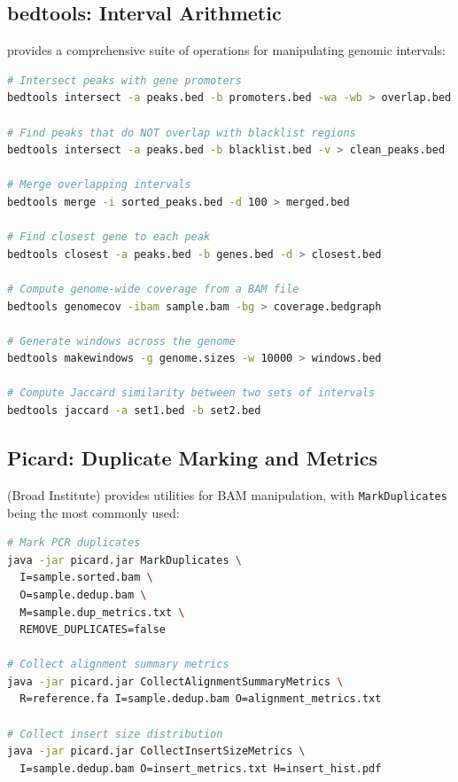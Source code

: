 \subsection{bedtools: Interval Arithmetic}
\label{subsec:bioinf:bedtools}

 provides a comprehensive suite of operations for manipulating genomic intervals:

\begin{lstlisting}[language=bash,caption={Common bedtools operations.},label=lst:bedtools]
# Intersect peaks with gene promoters
bedtools intersect -a peaks.bed -b promoters.bed -wa -wb > overlap.bed

# Find peaks that do NOT overlap with blacklist regions
bedtools intersect -a peaks.bed -b blacklist.bed -v > clean_peaks.bed

# Merge overlapping intervals
bedtools merge -i sorted_peaks.bed -d 100 > merged.bed

# Find closest gene to each peak
bedtools closest -a peaks.bed -b genes.bed -d > closest.bed

# Compute genome-wide coverage from a BAM file
bedtools genomecov -ibam sample.bam -bg > coverage.bedgraph

# Generate windows across the genome
bedtools makewindows -g genome.sizes -w 10000 > windows.bed

# Compute Jaccard similarity between two sets of intervals
bedtools jaccard -a set1.bed -b set2.bed
\end{lstlisting}

\subsection{Picard: Duplicate Marking and Metrics}
\label{subsec:bioinf:picard}

 (Broad Institute) provides utilities for BAM manipulation, with \texttt{MarkDuplicates} being the most commonly used:

\begin{lstlisting}[language=bash,caption={Picard MarkDuplicates and metrics collection.},label=lst:picard]
# Mark PCR duplicates
java -jar picard.jar MarkDuplicates \
  I=sample.sorted.bam \
  O=sample.dedup.bam \
  M=sample.dup_metrics.txt \
  REMOVE_DUPLICATES=false

# Collect alignment summary metrics
java -jar picard.jar CollectAlignmentSummaryMetrics \
  R=reference.fa I=sample.dedup.bam O=alignment_metrics.txt

# Collect insert size distribution
java -jar picard.jar CollectInsertSizeMetrics \
  I=sample.dedup.bam O=insert_metrics.txt H=insert_hist.pdf
\end{lstlisting}

